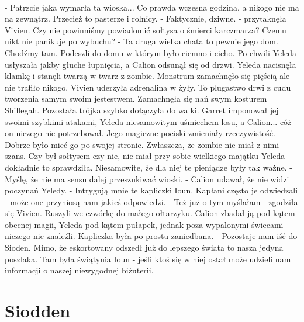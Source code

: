 \documentclass[10pt,twoside,twocolumn]{book}
\begin{document}
\paragraph{}
- Patrzcie jaka wymarła ta wioska... Co prawda wczesna godzina, a nikogo nie ma na zewnątrz. Przecież to pasterze i rolnicy.\newline
\indent - Faktycznie, dziwne. - przytaknęła Vivien. Czy nie powinniśmy powiadomić sołtysa o śmierci karczmarza? Czemu nikt nie panikuje po wybuchu?\newline
\indent - Ta druga wielka chata to pewnie jego dom. Chodźmy tam.\newline
Podeszli do domu w którym było ciemno i cicho. 
Po chwili Yeleda usłyszała jakby głuche łupnięcia, a Calion odsunął się od drzwi. 
Yeleda nacisnęła klamkę i stanęli twarzą w twarz z zombie. 
Monstrum zamachnęło się pięścią ale nie trafiło nikogo. 
Vivien uderzyła adrenalina w żyły. 
To plugastwo drwi z cudu tworzenia samym swoim jestestwem. 
Zamachnęła się nań swym kosturem Shillegah. 
Pozostała trójka szybko dołączyła do walki. 
Garret imponował jej swoimi szybkimi atakami, Yeleda niesamowitym uśmiechem losu, a Calion... cóż on niczego nie potrzebował. 
Jego magiczne pociski zmieniały rzeczywistość. 
Dobrze było mieć go po swojej stronie. 
Zwłaszcza, że zombie nie miał z nimi szans. 
Czy był sołtysem czy nie, nie miał przy sobie wielkiego majątku Yeleda dokładnie to sprawdziła. 
Niesamowite, że dla niej te pieniądze były tak ważne.\newline
\indent - Myślę, że nie ma sensu dalej przeszukiwać wioski. - Calion udawał, że nie widzi poczynań Yeledy. - Intrygują mnie te kapliczki Ioun. Kapłani często je odwiedzali - może one przyniosą nam jakieś odpowiedzi.\newline
\indent - Też już o tym myślałam - zgodziła się Vivien. \newline 
Ruszyli we czwórkę do małego ołtarzyku. Calion zbadał ją pod kątem obecnej magii, Yeleda pod kątem pułapek, jednak poza wypalonymi świecami niczego nie znaleźli. Kapliczka była po prostu zaniedbana.\newline
\indent - Pozostaje nam iść do Sioden. Mimo, że eskortowany odszedł już do lepszego świata to nasza jedyna poszlaka. Tam była świątynia Ioun - jeśli ktoś się w niej ostał może udzieli nam informacji o naszej niewygodnej biżuterii.\newline

\section*{Siodden}
\end{document}
